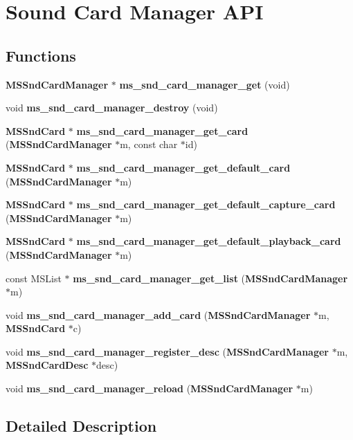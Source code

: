 \section{Sound Card Manager A\-P\-I}
\label{group__mediastreamer2__soundcardmanager}
\subsection*{Functions}
\begin{DoxyCompactItemize}
\item 
{\bf M\-S\-Snd\-Card\-Manager} $\ast$ {\bf ms\-\_\-snd\-\_\-card\-\_\-manager\-\_\-get} (void)
\item 
void {\bf ms\-\_\-snd\-\_\-card\-\_\-manager\-\_\-destroy} (void)
\item 
{\bf M\-S\-Snd\-Card} $\ast$ {\bf ms\-\_\-snd\-\_\-card\-\_\-manager\-\_\-get\-\_\-card} ({\bf M\-S\-Snd\-Card\-Manager} $\ast$m, const char $\ast$id)
\item 
{\bf M\-S\-Snd\-Card} $\ast$ {\bf ms\-\_\-snd\-\_\-card\-\_\-manager\-\_\-get\-\_\-default\-\_\-card} ({\bf M\-S\-Snd\-Card\-Manager} $\ast$m)
\item 
{\bf M\-S\-Snd\-Card} $\ast$ {\bf ms\-\_\-snd\-\_\-card\-\_\-manager\-\_\-get\-\_\-default\-\_\-capture\-\_\-card} ({\bf M\-S\-Snd\-Card\-Manager} $\ast$m)
\item 
{\bf M\-S\-Snd\-Card} $\ast$ {\bf ms\-\_\-snd\-\_\-card\-\_\-manager\-\_\-get\-\_\-default\-\_\-playback\-\_\-card} ({\bf M\-S\-Snd\-Card\-Manager} $\ast$m)
\item 
const M\-S\-List $\ast$ {\bf ms\-\_\-snd\-\_\-card\-\_\-manager\-\_\-get\-\_\-list} ({\bf M\-S\-Snd\-Card\-Manager} $\ast$m)
\item 
void {\bf ms\-\_\-snd\-\_\-card\-\_\-manager\-\_\-add\-\_\-card} ({\bf M\-S\-Snd\-Card\-Manager} $\ast$m, {\bf M\-S\-Snd\-Card} $\ast$c)
\item 
void {\bf ms\-\_\-snd\-\_\-card\-\_\-manager\-\_\-register\-\_\-desc} ({\bf M\-S\-Snd\-Card\-Manager} $\ast$m, {\bf M\-S\-Snd\-Card\-Desc} $\ast$desc)
\item 
void {\bf ms\-\_\-snd\-\_\-card\-\_\-manager\-\_\-reload} ({\bf M\-S\-Snd\-Card\-Manager} $\ast$m)
\end{DoxyCompactItemize}


\subsection{Detailed Description}


